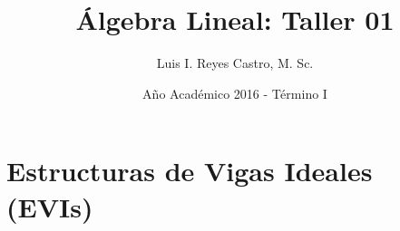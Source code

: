 \documentclass[ 10pt, xcolor = dvipsnames]{beamer}
\title[\'Algebra Lineal: Taller 01]{\'Algebra Lineal: \textbf{Taller 01} }
\author[L. I. Reyes Castro]{Luis I. Reyes Castro, M. Sc.}
\institute[ESPOL]{\normalsize Escuela Superior Polit\'ecnica del Litoral (ESPOL) \\ Guayaquil - Ecuador}
\date[]{\small A\~no Acad\'emico 2016 - T\'ermino I}
\begin{document}
\begin{frame}[noframenumbering]
\titlepage
\end{frame}


\section{Estructuras de Vigas Ideales (EVIs)}
\end{document}

